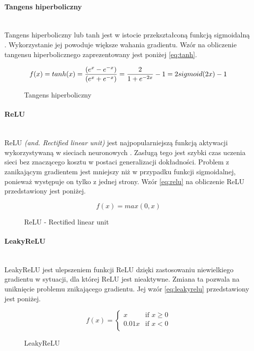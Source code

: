\paragraph{Tangens hiperboliczny} \mbox{}\\
Tangens hiperboliczny lub tanh jest w istocie przekształconą funkcją sigmoidalną
\cite{activationFunctions, activationFunctionsV2}. Wykorzystanie
jej powoduje większe wahania gradientu. Wzór na obliczenie tangensu hiperbolicznego
zaprezentowany jest poniżej \ref{eq:tanh}.
\begin{figure}[h!]
\renewcommand{\figurename}{Wzór}%
\begin{equation} \label{eq:tanh}
f(x) = tanh(x) = \frac{(e^x - e^{-x})}{(e^x + e^{-x})} = \frac{2}{1+e^{-2x}} - 1 = 2 sigmoid(2x) - 1\\
\end{equation}
\caption{Tangens hiperboliczny}
\end{figure}

\paragraph{ReLU} \mbox{}\\
ReLU \textit{(and. Rectified linear unit)} jest najpopularniejszą funkcją
aktywacji wykorzystywaną w sieciach neuronowych \cite{CS231n_activ, WIKIrectifier}.
Zasługą tego jest szybki czas uczenia sieci bez znaczącego kosztu w postaci generalizacji
dokładności. Problem z zanikającym gradientem jest mniejszy niż w przypadku funkcji
sigmoidalnej, ponieważ występuje on tylko z jednej strony.
Wzór \ref{eq:relu} na obliczenie ReLU przedstawiony jest poniżej.
\begin{figure}[h!]
\renewcommand{\figurename}{Wzór}%
\begin{equation} \label{eq:relu}
f(x) = max(0, x)
\end{equation}
\caption{ReLU - Rectified linear unit}
\end{figure}

\paragraph{LeakyReLU} \mbox{}\\
LeakyReLU jest ulepszeniem funkcji ReLU \cite{CS231n_activ} dzięki zastosowaniu niewielkiego
gradientu w sytuacji, dla której ReLU jest nieaktywne. Zmiana ta pozwala na uniknięcie
problemu znikającego gradientu. Jej wzór \ref{eq:leakyrelu} przedstawiony jest poniżej.
\begin{figure}[h!]
\renewcommand{\figurename}{Wzór}%
\begin{equation} \label{eq:leakyrelu}
f(x) =
\begin{cases}
x & \text{if } x \geqslant 0 \\
0.01x & \text{if } x < 0 \\
\end{cases}
\end{equation}
\caption{LeakyReLU}
\end{figure}

